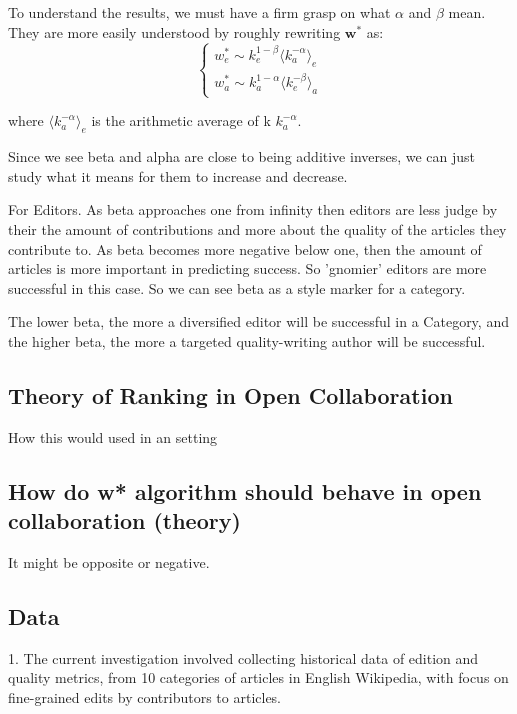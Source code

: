 \documentclass{acm_proc_article-sp}
\begin{document}
To understand the results, we must have a firm grasp on what $\alpha$ and $\beta$ mean. They are more easily understood by roughly rewriting $\mathbf{w^*}$ as:
\begin{equation}
\begin{cases}
w^{*}_{e} \sim k^{1-\beta}_{e} \langle k_{a}^{-\alpha}\rangle_e \\

w^{*}_{a} \sim k^{1-\alpha}_{a} \langle k_{e}^{-\beta}\rangle_a
\end{cases}
\end{equation}

where $\langle k_{a}^{-\alpha}\rangle_e$ is the arithmetic average of k  $k_{a}^{-\alpha}$. 

Since we see beta and alpha are close to being additive inverses, we can just study what it means for them to increase and decrease.

For Editors.
As beta approaches one from infinity then editors are less judge by their the amount of contributions and more about the quality of the articles they contribute to. As beta becomes more negative below one, then the amount of articles is more important in predicting success.  So 'gnomier' editors are more successful in this case. So we can see beta as a style marker for a category.

The lower beta, the more a diversified editor will be successful in a Category, and the higher beta, the more a targeted quality-writing author will be successful.


\subsection{Theory of Ranking in Open Collaboration}
How this would used in an setting

\subsection{How do w* algorithm should behave in open collaboration (theory)}

It might be opposite or negative.

\subsection{Data}
1. The current investigation involved collecting historical data of edition and quality metrics, from 10 categories of articles in English Wikipedia, with focus on fine-grained edits by contributors to articles.
\end{document}
